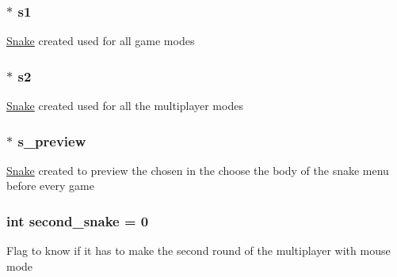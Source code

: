 \subsubsection[{\texorpdfstring{s1}{s1}}]{$\ast$ s1\hspace{0.3cm}{\ttfamily [static]}}\hypertarget{group__man__events_gaf79c0d77b0cca9ebf96bbbed1f88aed0}{}\label{group__man__events_gaf79c0d77b0cca9ebf96bbbed1f88aed0}
\hyperlink{structSnake}{Snake} created used for all game modes 
\subsubsection[{\texorpdfstring{s2}{s2}}]{$\ast$ s2\hspace{0.3cm}{\ttfamily [static]}}\hypertarget{group__man__events_ga5b853e8b22f27ef547e5b45e4197d308}{}\label{group__man__events_ga5b853e8b22f27ef547e5b45e4197d308}
\hyperlink{structSnake}{Snake} created used for all the multiplayer modes 
\subsubsection[{\texorpdfstring{s\+\_\+preview}{s_preview}}]{$\ast$ s\+\_\+preview\hspace{0.3cm}{\ttfamily [static]}}\hypertarget{group__man__events_gad4cd59e08d196fdec29b274d2f27254b}{}\label{group__man__events_gad4cd59e08d196fdec29b274d2f27254b}
\hyperlink{structSnake}{Snake} created to preview the chosen in the choose the body of the snake menu before every game 
\subsubsection[{\texorpdfstring{second\+\_\+snake}{second_snake}}]{\setlength{\rightskip}{0pt plus 5cm}int second\+\_\+snake = 0\hspace{0.3cm}{\ttfamily [static]}}\hypertarget{group__man__events_ga559fc485a85afead1ca991d70e7c72ee}{}\label{group__man__events_ga559fc485a85afead1ca991d70e7c72ee}
Flag to know if it has to make the second round of the multiplayer with mouse mode 
